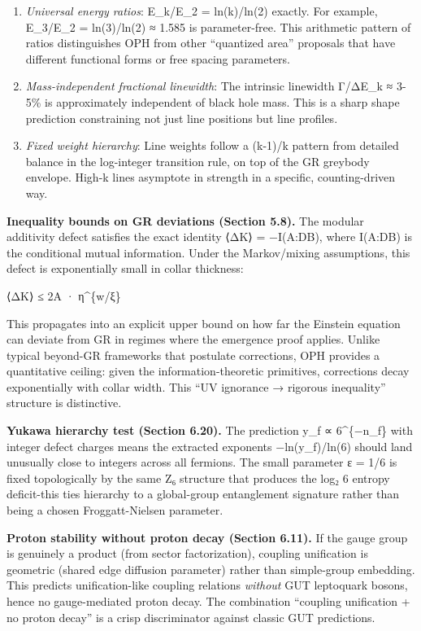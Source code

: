 \documentclass[11pt,a4paper]{article}
\theoremstyle{remark}
\begin{document}
\begin{enumerate}
\def\labelenumi{\arabic{enumi}.}
\item
  \emph{Universal energy ratios}: E\_k/E\_2 = ln(k)/ln(2) exactly. For example, E\_3/E\_2 = ln(3)/ln(2) ≈ 1.585 is parameter-free. This arithmetic pattern of ratios distinguishes OPH from other ``quantized area'' proposals that have different functional forms or free spacing parameters.
\item
  \emph{Mass-independent fractional linewidth}: The intrinsic linewidth Γ/ΔE\_k ≈ 3-5\% is approximately independent of black hole mass. This is a sharp shape prediction constraining not just line positions but line profiles.
\item
  \emph{Fixed weight hierarchy}: Line weights follow a (k-1)/k pattern from detailed balance in the log-integer transition rule, on top of the GR greybody envelope. High-k lines asymptote in strength in a specific, counting-driven way.
\end{enumerate}

\textbf{Inequality bounds on GR deviations (Section 5.8).} The modular additivity defect satisfies the exact identity ⟨ΔK⟩ = −I(A:D\textbar B), where I(A:D\textbar B) is the conditional mutual information. Under the Markov/mixing assumptions, this defect is exponentially small in collar thickness:

\textbar⟨ΔK⟩\textbar{} ≤ 2\textbar A\textbar{} · η\^{}\{w/ξ\}

This propagates into an explicit upper bound on how far the Einstein equation can deviate from GR in regimes where the emergence proof applies. Unlike typical beyond-GR frameworks that postulate corrections, OPH provides a quantitative ceiling: given the information-theoretic primitives, corrections decay exponentially with collar width. This ``UV ignorance → rigorous inequality'' structure is distinctive.

\textbf{Yukawa hierarchy test (Section 6.20).} The prediction y\_f ∝ 6\^{}\{−n\_f\} with integer defect charges means the extracted exponents −ln(y\_f)/ln(6) should land unusually close to integers across all fermions. The small parameter ε = 1/6 is fixed topologically by the same Z₆ structure that produces the log₂ 6 entropy deficit-this ties hierarchy to a global-group entanglement signature rather than being a chosen Froggatt-Nielsen parameter.

\textbf{Proton stability without proton decay (Section 6.11).} If the gauge group is genuinely a product (from sector factorization), coupling unification is geometric (shared edge diffusion parameter) rather than simple-group embedding. This predicts unification-like coupling relations \emph{without} GUT leptoquark bosons, hence no gauge-mediated proton decay. The combination ``coupling unification + no proton decay'' is a crisp discriminator against classic GUT predictions.
\end{document}
